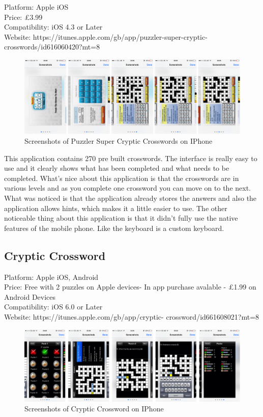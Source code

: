 Platform: Apple iOS \\ Price: \pounds3.99 \\ Compatibility: iOS 4.3 or Later \\
Website: https://itunes.apple.com/gb/app/puzzler-super-cryptic-
crosswords/id616060420?mt=8

\begin{figure}[H]
    \includegraphics[width=\linewidth]
        {research/mobile_platforms/pscs.png}
    \caption{Screenshots of Puzzler Super Cryptic Crosswords on IPhone}
\end{figure}

This application contains 270 pre built crosswords. The interface is really easy
to use and it clearly shows what has been completed and what needs to be
completed. What’s nice about this application is that the crosswords are in
various levels and as you complete one crossword you can move on to the next.
What was noticed is that the application already stores the answers and also the
application allows hints, which makes it a little easier to use. The other
noticeable thing about this application is that it didn’t fully use the native
features of the mobile phone. Like the keyboard is a custom keyboard.


\subsection{Cryptic Crossword}

Platform: Apple iOS, Android\\ Price: Free with 2 puzzles on Apple devices- In
app purchase avalable - \pounds1.99 on Android Devices\\ Compatibility: iOS 6.0
or Later\\ Website: https://itunes.apple.com/gb/app/cryptic-
crossword/id661608021?mt=8


\begin{figure}[H]
    \includegraphics[width=\linewidth]
        {research/mobile_platforms/cc.png}
    \caption{Screenshots of Cryptic Crossword on IPhone}
\end{figure}

